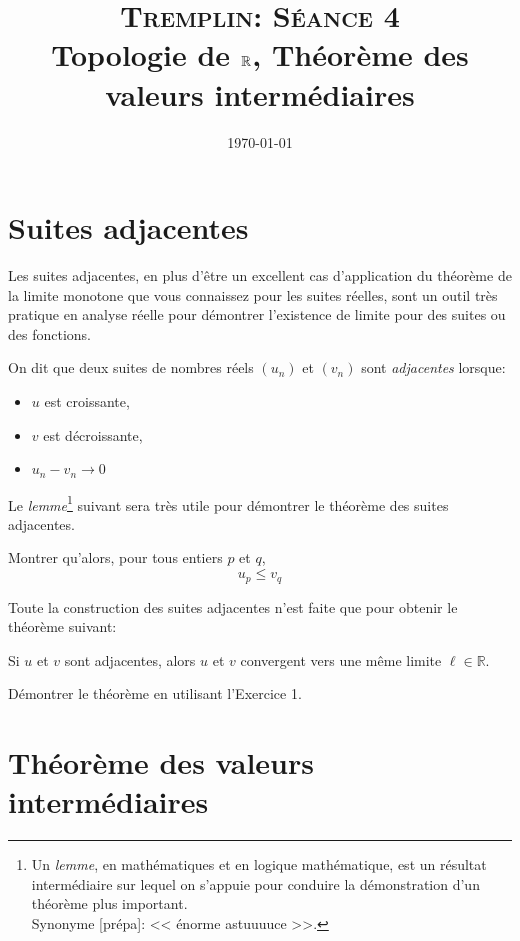\documentclass[12pt]{article}
\title{\textsc{Tremplin: Séance 4}\\ Topologie de $\RR$, Théorème des valeurs intermédiaires}
\date{\today}
\author{}
\newcommand{\RR}{\mathbb R}
\theoremstyle{definition}
\theoremstyle{theorem}
\theoremstyle{remark}
\begin{document}
\maketitle

\section*{Suites adjacentes}

Les suites adjacentes, en plus d'être un excellent cas d'application du théorème de la limite monotone que vous connaissez pour les suites réelles, sont un outil très pratique en analyse réelle pour démontrer l'existence de limite pour des suites ou des fonctions.

\begin{defn}
On dit que deux suites de nombres réels $(u_n)$ et $(v_n)$ sont \textit{adjacentes} lorsque:
\begin{itemize}
	\item $u$ est croissante,
	\item $v$ est décroissante,
	\item $u_n - v_n \longrightarrow 0$
\end{itemize}
\end{defn}

Le \textit{lemme}\footnote{Un \textit{lemme}, en mathématiques et en logique mathématique, est un résultat intermédiaire sur lequel on s'appuie pour conduire la démonstration d'un théorème plus important.\\
Synonyme [prépa]: << énorme astuuuuce >>.} suivant sera très utile pour démontrer le théorème des suites adjacentes.

\begin{exer}
	Montrer qu'alors, pour tous entiers $p$ et $q$,
	\[
	u_p \leq v_q
	\]
\end{exer}


Toute la construction des suites adjacentes n'est faite que pour obtenir le théorème suivant:

\begin{thm}
	Si $u$ et $v$ sont adjacentes, alors $u$ et $v$ convergent vers une même limite $\ell\in\RR$.
\end{thm}

\begin{exer}
	Démontrer le théorème en utilisant l'Exercice 1.
\end{exer}

\section*{Théorème des valeurs intermédiaires}
\end{document}
